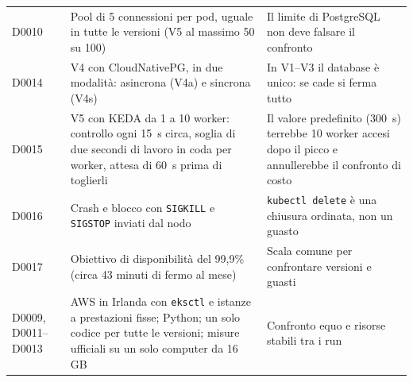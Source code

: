 \begin{table}[H]
\begin{tabularx}{\linewidth}{@{}>{\raggedright\arraybackslash}p{1.9cm}LL@{}}
D0010 & Pool di 5 connessioni per pod, uguale in tutte le versioni (V5 al massimo 50 su 100) & Il limite di PostgreSQL non deve falsare il confronto \\
D0014 & V4 con CloudNativePG, in due modalità: asincrona (V4a) e sincrona (V4s) & In V1--V3 il database è unico: se cade si ferma tutto \\
D0015 & V5 con KEDA da 1 a 10 worker: controllo ogni 15~s circa, soglia di due secondi di lavoro in coda per worker, attesa di 60~s prima di toglierli & Il valore predefinito (300~s) terrebbe 10 worker accesi dopo il picco e annullerebbe il confronto di costo \\
D0016 & Crash e blocco con \texttt{SIGKILL} e \texttt{SIGSTOP} inviati dal nodo & \texttt{kubectl delete} è una chiusura ordinata, non un guasto \\
D0017 & Obiettivo di disponibilità del 99,9\% (circa 43 minuti di fermo al mese) & Scala comune per confrontare versioni e guasti \\
D0009, D0011--D0013 & AWS in Irlanda con \texttt{eksctl} e istanze a prestazioni fisse; Python; un solo codice per tutte le versioni; misure ufficiali su un solo computer da 16 GB & Confronto equo e risorse stabili tra i run \\
\bottomrule
\end{tabularx}
\end{table}
